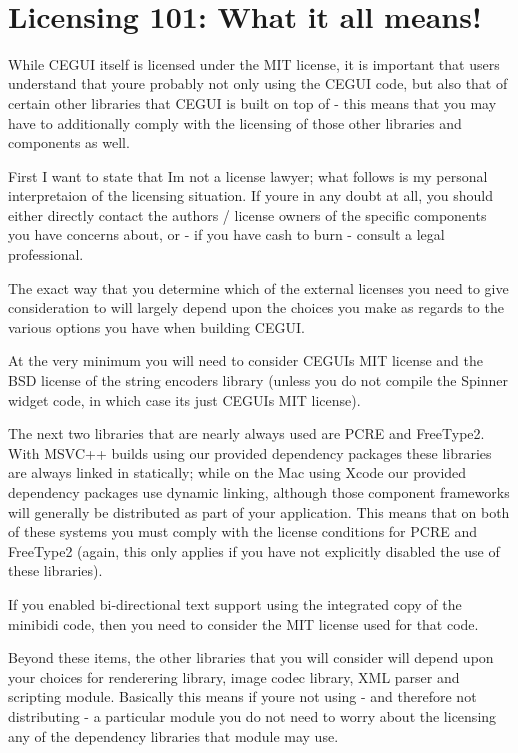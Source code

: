 ~\newline
 \hypertarget{licensing_licensing_sec_4}{}\section{Licensing 101\+: What it all means!}\label{licensing_licensing_sec_4}
While C\+E\+G\+UI itself is licensed under the M\+IT license, it is important that users understand that you\textquotesingle{}re probably not only using the C\+E\+G\+UI code, but also that of certain other libraries that C\+E\+G\+UI is built on top of -\/ this means that you may have to additionally comply with the licensing of those other libraries and components as well.

First I want to state that I\textquotesingle{}m not a \textquotesingle{}license lawyer\textquotesingle{}; what follows is my personal interpretaion of the licensing situation. If you\textquotesingle{}re in any doubt at all, you should either directly contact the authors / license owners of the specific components you have concerns about, or -\/ if you have cash to burn -\/ consult a legal professional.

The exact way that you determine which of the external licenses you need to give consideration to will largely depend upon the choices you make as regards to the various options you have when building C\+E\+G\+UI.

At the very minimum you will need to consider C\+E\+G\+UI\textquotesingle{}s M\+IT license and the B\+SD license of the string encoders library (unless you do not compile the Spinner widget code, in which case it\textquotesingle{}s just C\+E\+G\+UI\textquotesingle{}s M\+IT license).

The next two libraries that are nearly always used are P\+C\+RE and Free\+Type2. With M\+S\+V\+C++ builds using our provided dependency packages these libraries are always linked in statically; while on the Mac using Xcode our provided dependency packages use dynamic linking, although those component frameworks will generally be distributed as part of your application. This means that on both of these systems you must comply with the license conditions for P\+C\+RE and Free\+Type2 (again, this only applies if you have not explicitly disabled the use of these libraries).

If you enabled bi-\/directional text support using the integrated copy of the minibidi code, then you need to consider the M\+IT license used for that code.

Beyond these items, the other libraries that you will consider will depend upon your choices for renderering library, image codec library, X\+ML parser and scripting module. Basically this means if you\textquotesingle{}re not using -\/ and therefore not distributing -\/ a particular module you do not need to worry about the licensing any of the dependency libraries that module may use.

